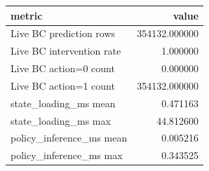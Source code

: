 \begin{tabular}{lr}
\toprule
metric & value \\
\midrule
Live BC prediction rows & 354132.000000 \\
Live BC intervention rate & 1.000000 \\
Live BC action=0 count & 0.000000 \\
Live BC action=1 count & 354132.000000 \\
state\_loading\_ms mean & 0.471163 \\
state\_loading\_ms max & 44.812600 \\
policy\_inference\_ms mean & 0.005216 \\
policy\_inference\_ms max & 0.343525 \\
\bottomrule
\end{tabular}
